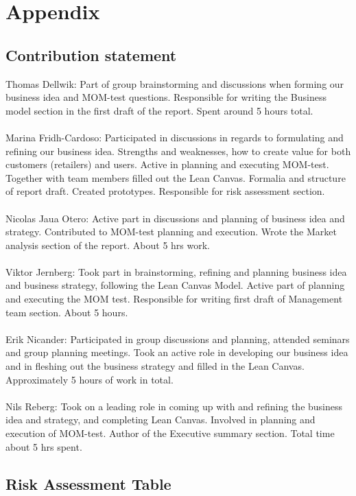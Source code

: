 \documentclass[titlepage]{article}
\begin{document}
\section{Appendix}
\subsection{Contribution statement}
Thomas Dellwik: Part of group brainstorming and discussions when forming our business idea and MOM-test questions. Responsible for writing the Business model section in the first draft of the report. Spent around 5 hours total. \\
\\
Marina Fridh-Cardoso: Participated in discussions in regards to formulating and refining our business idea. Strengths and weaknesses, how to create value for both customers (retailers) and users. Active in planning and executing MOM-test. Together with team members filled out the Lean Canvas. Formalia and structure of report draft. Created prototypes. Responsible for risk assessment section. \\
\\
Nicolas Jaua Otero: Active part in discussions and planning of business idea and strategy. Contributed to MOM-test planning and execution. Wrote the Market analysis section of the report. About 5 hrs work.\\
\\
Viktor Jernberg: Took part in brainstorming, refining and planning business idea and business strategy, following the Lean Canvas Model. Active part of planning and executing the MOM test. Responsible for writing first draft of Management team section. About 5 hours.\\
\\
Erik Nicander: Participated in group discussions and planning, attended seminars and group planning meetings. Took an active role in developing our business idea and in fleshing out the business strategy and filled in the Lean Canvas. Approximately 5 hours of work in total.\\
\\
Nils Reberg: Took on a leading role in coming up with and refining the business idea and strategy, and completing Lean Canvas.  Involved in planning and execution of MOM-test. Author of the Executive summary section. Total time about 5 hrs spent.\\

\subsection{Risk Assessment Table} \label{risktable}
\end{document}
